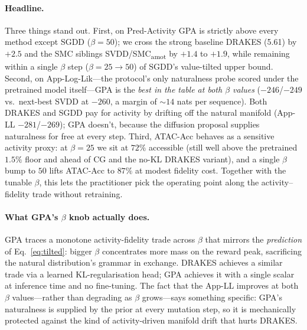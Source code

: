 \documentclass{article}
\theoremstyle{definition}
\theoremstyle{remark}
\newcommand{\gpa}{\textsc{GPA}\xspace}
\newcommand{\drakes}{\textsc{DRAKES}\xspace}
\newcommand{\svdd}{\textsc{SVDD}\xspace}
\newcommand{\smcamot}{\textsc{SMC}\textsubscript{amot}\xspace}
\newcommand{\sgdd}{\textsc{SGDD}\xspace}
\begin{document}
\paragraph{Headline.}
Three things stand out. First, on Pred-Activity \gpa{} is strictly above every method except \sgdd{} ($\beta\!=\!50$); we cross the strong baseline \drakes{} (5.61) by $+2.5$ and the SMC siblings \svdd{}/\smcamot{} by $+1.4$ to $+1.9$, while remaining within a single $\beta$ step ($\beta\!=\!25\!\to\!50$) of \sgdd{}'s value-tilted upper bound. Second, on App-Log-Lik—the protocol's only naturalness probe scored under the pretrained model itself—\gpa{} is the \emph{best in the table at both $\beta$ values} ($-246$/$-249$ vs.\ next-best \svdd{} at $-260$, a margin of $\sim\!14$ nats per sequence). Both \drakes{} and \sgdd{} pay for activity by drifting off the natural manifold (App-LL $-281$/$-269$); \gpa{} doesn't, because the diffusion proposal supplies naturalness for free at every step. Third, ATAC-Acc behaves as a sensitive activity proxy: at $\beta\!=\!25$ we sit at $72\%$ accessible (still well above the pretrained $1.5\%$ floor and ahead of CG and the no-KL \drakes{} variant), and a single $\beta$ bump to $50$ lifts ATAC-Acc to $87\%$ at modest fidelity cost. Together with the tunable $\beta$, this lets the practitioner pick the operating point along the activity–fidelity trade without retraining.

\paragraph{What \gpa{}'s $\beta$ knob actually does.}
\gpa{} traces a monotone activity-fidelity trade across $\beta$ that mirrors the \emph{prediction} of Eq.~\ref{eq:tilted}: bigger $\beta$ concentrates more mass on the reward peak, sacrificing the natural distribution's grammar in exchange. \drakes{} achieves a similar trade via a learned KL-regularisation head; \gpa{} achieves it with a single scalar at inference time and no fine-tuning. The fact that the App-LL improves at both $\beta$ values—rather than degrading as $\beta$ grows—says something specific: \gpa{}'s naturalness is supplied by the prior at every mutation step, so it is mechanically protected against the kind of activity-driven manifold drift that hurts \drakes{}.
\end{document}
